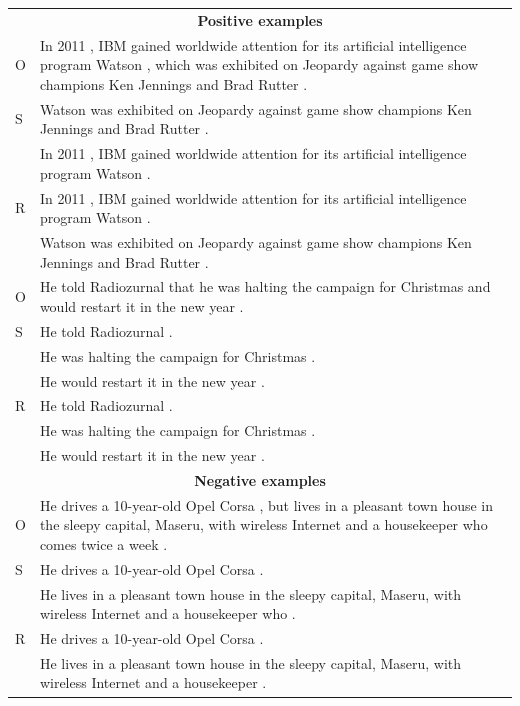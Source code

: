 \documentclass[10pt]{article}
\begin{document}
\begin{table}[ht]
\begin{tiny}
\begin{center}
\begin{tabular}{p{2mm}p{149mm}}\toprule
\multicolumn{2}{c}{\textbf{Positive examples}} \\
O       & In 2011 , IBM gained worldwide attention for its artificial intelligence program Watson , which was exhibited on Jeopardy against game show champions Ken Jennings and Brad Rutter .\\ 
S       & Watson was exhibited on Jeopardy against game show champions Ken Jennings and Brad Rutter .\\
        & In 2011 , IBM gained worldwide attention for its artificial intelligence program Watson .\\               
R       & In 2011 , IBM gained worldwide attention for its artificial intelligence program Watson .\\
        & Watson was exhibited on Jeopardy against game show champions Ken Jennings and Brad Rutter .\\
\midrule
O       & He told Radiozurnal that he was halting the campaign for Christmas and would restart it in the new year .\\ 
S       & He told Radiozurnal .\\
        & He was halting the campaign for Christmas .\\
        & He would restart it in the new year .\\
R       & He told Radiozurnal .\\
        & He was halting the campaign for Christmas .\\
        & He would restart it in the new year .\\
\toprule
\multicolumn{2}{c}{\textbf{Negative examples}} \\
O       & He drives a 10-year-old Opel Corsa , but lives in a pleasant town house in the sleepy capital, Maseru, with wireless Internet and a housekeeper who comes twice a week .\\ 
S       & He drives a 10-year-old Opel Corsa .\\
        & He lives in a pleasant town house in the sleepy capital, Maseru, with wireless Internet and a housekeeper who .\\
R       & He drives a 10-year-old Opel Corsa .\\
        & He lives in a pleasant town house in the sleepy capital, Maseru, with wireless Internet and a housekeeper .\\

\end{tabular}
\end{center}
\end{tiny}
\end{table}
\end{document}
